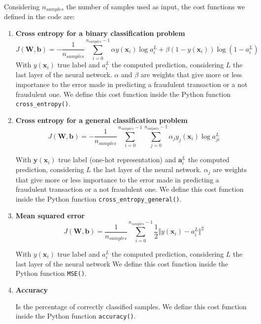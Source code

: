 \documentclass{Configuration_Files/PoliMi3i_thesis}
\begin{document}
Considering $n_{samples}$ the number of samples used as input, the cost functions we defined in the code are:
\begin{enumerate}
    \item \textbf{Cross entropy for a binary classification problem}
    $$J(\textbf{W}, \textbf{b}) = -\frac{1}{n_{samples}}\sum_{i=0}^{n_{samples}-1}{\alpha y(\mathbf{x}_i)\log{a_i^L}+\beta(1-y(\mathbf{x}_i))\log{(1-a_i^L)}}$$
    With $y(\mathbf{x}_{i})$ true label and $a_i^L$ the computed prediction, considering $L$ the last layer of the neural network. $\alpha$ and $\beta$ are weights that give more or less importance to the error made in predicting a fraudulent transaction or a not fraudulent one.
    We define this cost function inside the Python function \verb|cross_entropy()|.
    \item \textbf{Cross entropy for a general classification problem}
    $$J(\textbf{W}, \textbf{b}) = -\frac{1}{n_{samples}}\sum_{i=0}^{n_{samples}-1}{\sum_{j=0}^{n_{outputs}-1}{\alpha_{j} y_{j}(\mathbf{x}_{i})\log{a_{ji}^{L}}}}$$

    With $\mathbf{y}(\mathbf{x}_{i})$ true label (one-hot representation) and $\mathbf{a}_i^L$ the computed prediction, considering $L$ the last layer of the neural network. $\alpha_{j}$ are weights that give more or less importance to the error made in predicting a fraudulent transaction or a not fraudulent one. We define this cost function inside the Python function \verb|cross_entropy_general()|.
    \item \textbf{Mean squared error}
    $$J(\textbf{W}, \textbf{b}) = \frac{1}{n_{samples}}\sum_{i=0}^{n_{samples}-1}{\frac{1}{2} \Vert y(\mathbf{x}_i)-a_i^L\Vert^2}$$
    
    With $y(\mathbf{x}_{i})$ true label and $a_i^L$ the computed prediction, considering $L$ the last layer of the neural network
    We define this cost function inside the Python function \verb|MSE()|.
    \item \textbf{Accuracy}
    
    Is the percentage of correctly classified samples.
    We define this cost function inside the Python function \verb|accuracy()|.
\end{enumerate}
\end{document}
